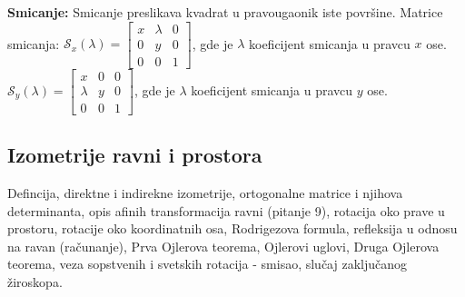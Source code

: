\documentclass[12pt]{article}
\begin{document}
\textbf{Smicanje:} Smicanje preslikava kvadrat u pravougaonik iste površine.
Matrice smicanja:
$\mathcal{S}_x(\lambda)=\begin{bmatrix}
        x & \lambda & 0 \\
        0 & y       & 0 \\
        0 & 0       & 1
    \end{bmatrix}$, gde je $\lambda$ koeficijent smicanja u pravcu $x$ ose.\\
$\mathcal{S}_y(\lambda)=\begin{bmatrix}
        x       & 0 & 0 \\
        \lambda & y & 0 \\
        0       & 0 & 1
    \end{bmatrix}$, gde je $\lambda$ koeficijent smicanja u pravcu $y$ ose.

\subsection{Izometrije ravni i prostora}
Defincija, direktne i indirekne izometrije, ortogonalne
matrice i njihova determinanta, opis afinih transformacija
ravni (pitanje 9), rotacija oko prave u prostoru, rotacije
oko koordinatnih osa, Rodrigezova formula, refleksija u
odnosu na ravan (računanje), Prva Ojlerova teorema,
Ojlerovi uglovi, Druga Ojlerova teorema, veza sopstvenih i
svetskih rotacija - smisao, slučaj zaključanog žiroskopa.\par

\vspace*{1cm}
\end{document}
